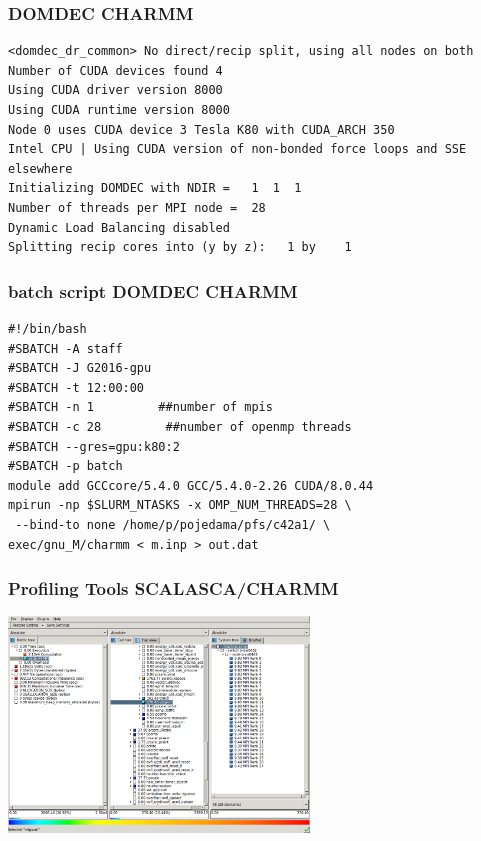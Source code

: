 \begin{frame}[fragile]
	\frametitle{DOMDEC CHARMM}
  
        \begin{verbatim}             
<domdec_dr_common> No direct/recip split, using all nodes on both                                                                                                                               
Number of CUDA devices found 4
Using CUDA driver version 8000
Using CUDA runtime version 8000
Node 0 uses CUDA device 3 Tesla K80 with CUDA_ARCH 350
Intel CPU | Using CUDA version of non-bonded force loops and SSE elsewhere
Initializing DOMDEC with NDIR =   1  1  1  
Number of threads per MPI node =  28 
Dynamic Load Balancing disabled
Splitting recip cores into (y by z):   1 by    1
        \end{verbatim}

\end{frame}

\begin{frame}[fragile]
	\frametitle{batch script DOMDEC CHARMM}
  
        \begin{verbatim}             
#!/bin/bash
#SBATCH -A staff
#SBATCH -J G2016-gpu
#SBATCH -t 12:00:00
#SBATCH -n 1         ##number of mpis
#SBATCH -c 28         ##number of openmp threads
#SBATCH --gres=gpu:k80:2
#SBATCH -p batch
module add GCCcore/5.4.0 GCC/5.4.0-2.26 CUDA/8.0.44   
mpirun -np $SLURM_NTASKS -x OMP_NUM_THREADS=28 \
 --bind-to none /home/p/pojedama/pfs/c42a1/ \
exec/gnu_M/charmm < m.inp > out.dat
        \end{verbatim}

\end{frame}



\begin{frame}
	\frametitle{Profiling Tools SCALASCA/CHARMM}
        \begin{center}
		\includegraphics[width=8cm]{images/cube_charmm.png}
        \end{center}
\end{frame}

